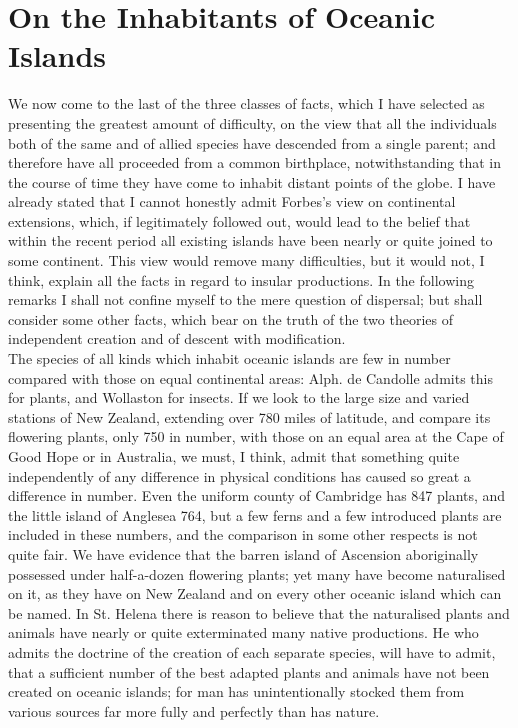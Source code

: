 \section{On the Inhabitants of Oceanic Islands}
\indent We now come to the last of the three classes of facts, which I have selected as presenting the greatest amount of difficulty, on the view that all the individuals both of the same and of allied species have descended from a single parent; and therefore have all proceeded from a common birthplace, notwithstanding that in the course of time they have come to inhabit distant points of the globe. I have already stated that I cannot honestly admit Forbes's view on continental extensions, which, if legitimately followed out, would lead to the belief that within the recent period all existing islands have been nearly or quite joined to some continent.  This view would remove many difficulties, but it would not, I think, explain all the facts in regard to insular productions. In the following remarks I shall not confine myself to the mere question of dispersal; but shall consider some other facts, which bear on the truth of the two theories of independent creation and of descent with modification.~\\
\indent The species of all kinds which inhabit oceanic islands are few in number compared with those on equal continental areas: Alph. de Candolle admits this for plants, and Wollaston for insects. If we look to the large size and varied stations of New Zealand, extending over 780 miles of latitude, and compare its flowering plants, only 750 in number, with those on an equal area at the Cape of Good Hope or in Australia, we must, I think, admit that something quite independently of any difference in physical conditions has caused so great a difference in number. Even the uniform county of Cambridge has 847 plants, and the little island of Anglesea 764, but a few ferns and a few introduced plants are included in these numbers, and the comparison in some other respects is not quite fair. We have evidence that the barren island of Ascension aboriginally possessed under half-a-dozen flowering plants; yet many have become naturalised on it, as they have on New Zealand and on every other oceanic island which can be named. In St. Helena there is reason to believe that the naturalised plants and animals have nearly or quite exterminated many native productions.  He who admits the doctrine of the creation of each separate species, will have to admit, that a sufficient number of the best adapted plants and animals have not been created on oceanic islands; for man has unintentionally stocked them from various sources far more fully and perfectly than has nature.~\\

